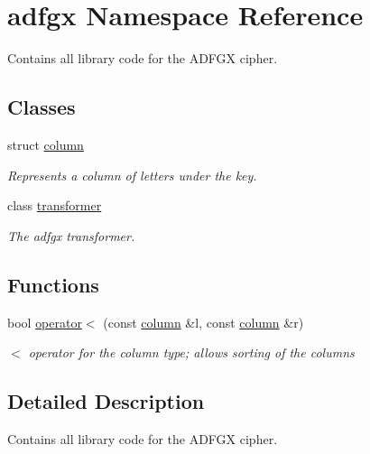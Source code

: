 \hypertarget{namespaceadfgx}{}\section{adfgx Namespace Reference}
\label{namespaceadfgx}


Contains all library code for the A\+D\+F\+GX cipher.  


\subsection*{Classes}
\begin{DoxyCompactItemize}
\item 
struct \hyperlink{structadfgx_1_1column}{column}
\begin{DoxyCompactList}\small\item\em Represents a column of letters under the key. \end{DoxyCompactList}\item 
class \hyperlink{classadfgx_1_1transformer}{transformer}
\begin{DoxyCompactList}\small\item\em The adfgx transformer. \end{DoxyCompactList}\end{DoxyCompactItemize}
\subsection*{Functions}
\begin{DoxyCompactItemize}
\item 
bool \hyperlink{namespaceadfgx_ada5b7d5617fefb5a253befa3d74f777b}{operator$<$} (const \hyperlink{structadfgx_1_1column}{column} \&l, const \hyperlink{structadfgx_1_1column}{column} \&r)\hypertarget{namespaceadfgx_ada5b7d5617fefb5a253befa3d74f777b}{}\label{namespaceadfgx_ada5b7d5617fefb5a253befa3d74f777b}

\begin{DoxyCompactList}\small\item\em $<$ operator for the column type; allows sorting of the columns \end{DoxyCompactList}\end{DoxyCompactItemize}


\subsection{Detailed Description}
Contains all library code for the A\+D\+F\+GX cipher. 

